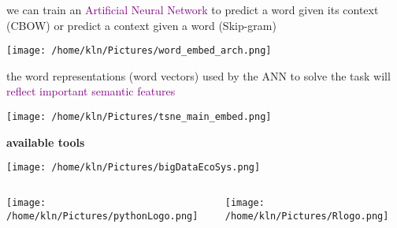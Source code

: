 \documentclass[8pt]{beamer}
\begin{document}
\begin{frame}%
we can train an \textcolor{purple}{Artificial Neural Network} to predict a word given its context (CBOW) or predict a context given a word (Skip-gram)\\
\medskip
\begin{center}
	\texttt{[image: /home/kln/Pictures/word\_embed\_arch.png]}
\end{center}
the word representations (word vectors) used by the ANN to solve the task will \textcolor{purple}{reflect important semantic features} 
\end{frame}

\begin{frame}
	\begin{center}
		\texttt{[image: /home/kln/Pictures/tsne\_main\_embed.png]}
	\end{center}
\end{frame}




\begin{frame}
	\begin{center}
		\textbf{available tools}
	\end{center}
\end{frame}

\begin{frame}{}
\begin{center}
\texttt{[image: /home/kln/Pictures/bigDataEcoSys.png]} 
\end{center}
\end{frame}

\begin{frame}
\begin{columns}
\begin{column}{0.5\textwidth}
   \begin{center}
		\texttt{[image: /home/kln/Pictures/pythonLogo.png]}   
   \end{center}
\end{column}
\begin{column}{0.5\textwidth}
    \begin{center}
		\texttt{[image: /home/kln/Pictures/Rlogo.png]}    
    \end{center}
\end{column}
\end{columns}
\end{frame}
\end{document}

